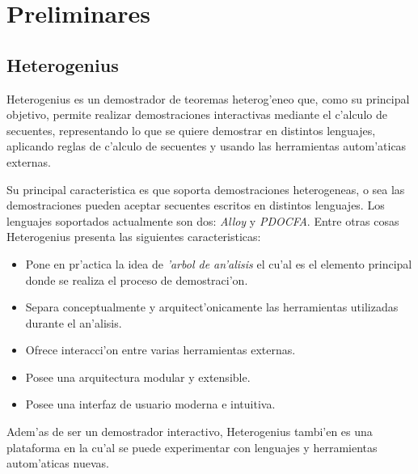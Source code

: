 \chapter{Preliminares}








\section{Heterogenius}

Heterogenius \cite{heterogenius} es un demostrador de teoremas heterog'eneo que, como su principal objetivo, permite realizar demostraciones interactivas mediante el c'alculo de secuentes, representando lo que se quiere demostrar en distintos lenguajes, aplicando reglas de c'alculo de secuentes y usando las herramientas autom'aticas externas. 

Su principal caracteristica es que soporta demostraciones heterogeneas, o sea las demostraciones pueden aceptar secuentes escritos en distintos lenguajes. Los lenguajes soportados actualmente son dos: \textit{Alloy} y \textit{PDOCFA}. Entre otras cosas Heterogenius presenta las siguientes caracteristicas:

\begin{itemize}

\item Pone en pr'actica la idea de \textit{'arbol de an'alisis} el cu'al es el elemento principal donde se realiza el proceso de demostraci'on.

\item Separa conceptualmente y arquitect'onicamente las herramientas utilizadas durante el an'alisis.

\item Ofrece interacci'on entre varias herramientas externas.

\item Posee una arquitectura modular y extensible.

\item Posee una interfaz de usuario moderna e intuitiva.

\end{itemize}

Adem'as de ser un demostrador interactivo, Heterogenius tambi'en es una plataforma en la cu'al se puede experimentar con lenguajes y herramientas autom'aticas nuevas.



